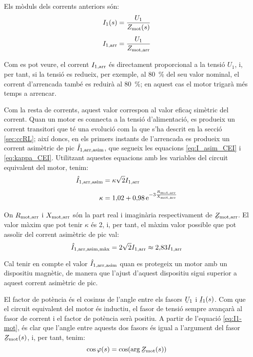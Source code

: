 Els mòduls dels corrents anteriors són:
\begin{subequations}
\begin{align}
    I_1(s) &= \frac{U_1}{Z_\mathrm{mot}(s)} \label{eq:mot-I1}\\[1ex]
    I_\mathrm{1,arr} &= \frac{U_1}{Z_\mathrm{mot,arr}}\label{eq:mot-Iarr}
\end{align}
\end{subequations}

Com es pot veure, el corrent $I_\mathrm{1,arr}$ és directament proporcional a la tensió $U_1$, i, per tant, si la tensió es redueix, per exemple, al \qty{80}{\%} del seu valor nominal, el corrent d'arrencada també es reduirà al \qty{80}{\%}; en aquest cas el motor trigarà més temps a arrencar.

Com la resta de corrents, aquest valor correspon al valor eficaç simètric del corrent. Quan un motor es connecta a la tensió d'alimentació, es produeix un corrent transitori que té una evolució com la que s'ha descrit en la secció \vref{sec:ccRL}; així doncs, en els primers instants de l'arrencada es produeix un corrent asimètric de pic $\hat{I}_\mathrm{1,arr,asim}$, que segueix les equacions \eqref{eq:I_asim_CEI} i \eqref{eq:kappa_CEI}. Utilitzant aquestes equacions amb les variables del circuit equivalent del motor, tenim:
\begin{subequations}
\begin{align}
    \hat{I}_\mathrm{1,arr,asim} &= \kappa \sqrt{2} I_\mathrm{1,arr}  \\[1ex]
    \kappa &= 1{,}02 + 0{,}98 \,\mathrm{e}^{-3\frac{R_\mathrm{mot,arr}}{X_\mathrm{mot,arr}}}
\end{align}
\end{subequations}

On $R_\mathrm{mot,arr}$ i $X_\mathrm{mot,arr}$ són la part real i imaginària respectivament de $\cmplx{Z}\ped{mot,arr}$. El valor màxim que pot tenir  $\kappa$ és 2, i, per tant, el màxim valor possible que pot assolir del corrent asimètric de pic val:
\begin{equation}
	\hat{I}_\mathrm{1,arr,asim,\text{màx}} =  2\sqrt{2} I_\mathrm{1,arr} \approx 2{,}83 I_\mathrm{1,arr} 
\end{equation}

Cal tenir en compte el valor $\hat{I}_\mathrm{1,arr,asim}$ quan es protegeix un motor amb un dispositiu magnètic, de manera que l'ajust d'aquest dispositiu sigui superior a aquest corrent asimètric de  pic.

El factor de potència és el cosinus de l'angle entre els fasors $\cmplx{U}_1$ i $\cmplx{I}_1(s)$. Com que el circuit equivalent del motor és inductiu, el fasor de tensió sempre avançarà al fasor de corrent i el factor de potència serà positiu. A partir de l'equació \eqref{eq:I1-mot}, és clar que l'angle entre aquests dos fasors és igual a l'argument del fasor $\cmplx{Z}\ped{mot}(s)$, i, per tant, tenim:
\begin{equation}\index{motors d'inducció!factor de potència}
	\cos\varphi(s) = \cos(\arg\cmplx{Z}\ped{mot}(s))\label{eq:cos-fi-mot}
\end{equation}

